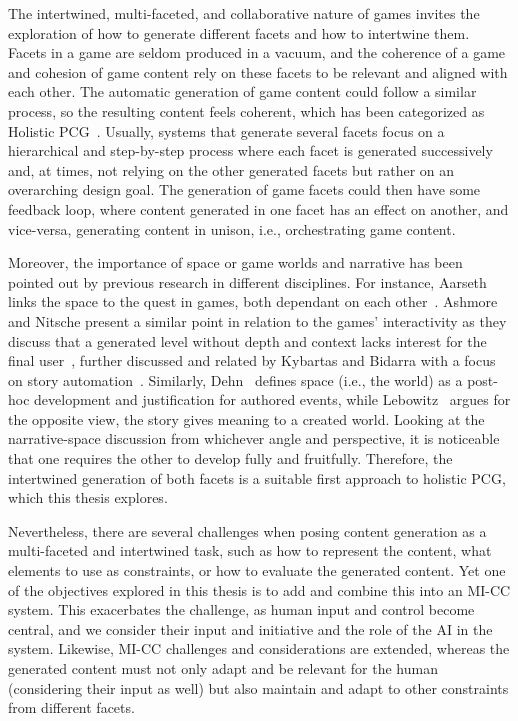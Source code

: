 The intertwined, multi-faceted, and collaborative nature of games invites the exploration of how to generate different facets and how to intertwine them. Facets in a game are seldom produced in a vacuum, and the coherence of a game and cohesion of game content rely on these facets to be relevant and aligned with each other. The automatic generation of game content could follow a similar process, so the resulting content feels coherent, which has been categorized as Holistic PCG~\cite{liapis_orchestrating_2019,salge_generative_2018}. Usually, systems that generate several facets focus on a hierarchical and step-by-step process where each facet is generated successively and, at times, not relying on the other generated facets but rather on an overarching design goal. The generation of game facets could then have some feedback loop, where content generated in one facet has an effect on another, and vice-versa, generating content in unison, i.e., orchestrating game content.

Moreover, the importance of space or game worlds and narrative has been pointed out by previous research in different disciplines. For instance, Aarseth links the space to the quest in games, both dependant on each other~\cite{kishino_hunt_2005}. Ashmore and Nitsche present a similar point in relation to the games' interactivity as they discuss that a generated level without depth and context lacks interest for the final user~\cite{ashmore_quest_2007}, further discussed and related by Kybartas and Bidarra with a focus on story automation~\cite{kybartas_quinn_survey_2017}. Similarly, Dehn~\cite{dehn_story_1981} defines space (i.e., the world) as a post-hoc development and justification for authored events, while Lebowitz~\cite{lebowitz_creating_1983} argues for the opposite view, the story gives meaning to a created world. Looking at the narrative-space discussion from whichever angle and perspective, it is noticeable that one requires the other to develop fully and fruitfully. Therefore, the intertwined generation of both facets is a suitable first approach to holistic PCG, which this thesis explores. 

Nevertheless, there are several challenges when posing content generation as a multi-faceted and intertwined task, such as how to represent the content, what elements to use as constraints, or how to evaluate the generated content. Yet one of the objectives explored in this thesis is to add and combine this into an MI-CC system. This exacerbates the challenge, as human input and control become central, and we consider their input and initiative and the role of the AI in the system. Likewise, MI-CC challenges and considerations are extended, whereas the generated content must not only adapt and be relevant for the human (considering their input as well) but also maintain and adapt to other constraints from different facets. 

